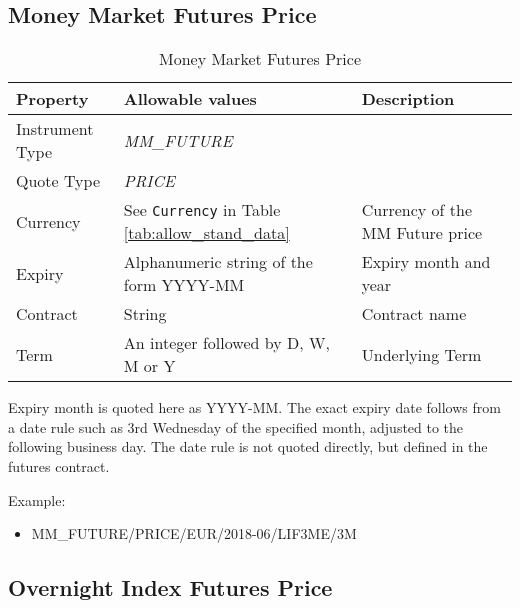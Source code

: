 \subsection{Money Market Futures Price}

\begin{table}[H]
\centering
  \begin{tabular}{|p{3cm}|p{4.5cm}|p{7cm}|}
  \hline
    {\bf Property} & {\bf Allowable values} & {\bf Description} \\ \hline
    Instrument Type & \emph{MM\_FUTURE} & \\ \hline
    Quote Type & \emph{PRICE} & \\ \hline
    Currency & See \lstinline!Currency! in Table \ref{tab:allow_stand_data}& Currency of the MM Future price\\ \hline
    Expiry & Alphanumeric string of the form YYYY-MM & Expiry month and year\\ \hline
    Contract & String & Contract name\\ \hline
    Term & An integer followed by D, W, M or Y & Underlying Term\\ \hline
  \end{tabular}
  \caption{Money Market Futures Price}
  \label{tab:mmfp_quote}
\end{table}

Expiry month is quoted here as YYYY-MM. The exact expiry date follows from a date rule such as 3rd
Wednesday of the specified month, adjusted to the following business day. The date rule is not quoted directly, but
defined in the futures contract.

\medskip
Example:
\begin{itemize}
\item {MM\_FUTURE/PRICE/EUR/2018-06/LIF3ME/3M}
\end{itemize}

\subsection{Overnight Index Futures Price}

